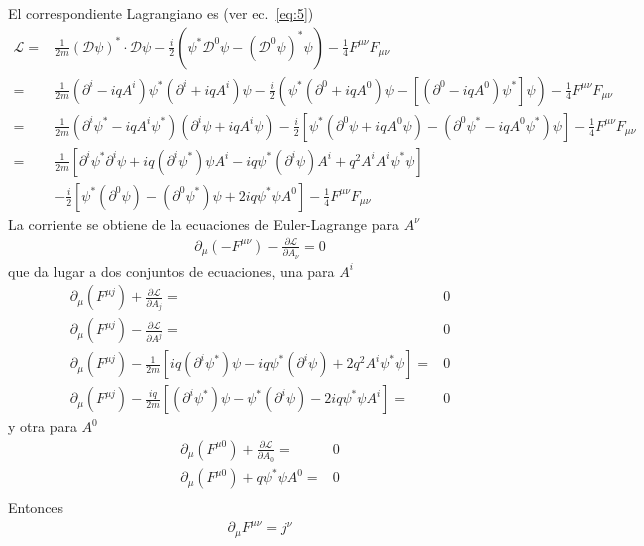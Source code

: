 El correspondiente Lagrangiano es (ver ec.~\eqref{eq:5})
\begin{align*}
    \mathcal{L}=&\frac{1}{2m}(\boldsymbol{\mathcal{D}}\psi)^*\cdot\boldsymbol{\mathcal{D}}\psi-\frac{i}{2}
  \left(    \psi^*\mathcal{D}^0\psi-(\mathcal{D}^0\psi)^*\psi  \right)-\frac{1}{4}F^{\mu\nu}F_{\mu\nu}\\
=&\frac{1}{2m}(\partial^i-i q A^i)\psi^*(\partial^i+i q A^i)\psi-\frac{i}{2}
  \left(    \psi^*(\partial^0+i q A^0)\psi-[(\partial^0-i q A^0)\psi^*]\psi  \right)-\frac{1}{4}F^{\mu\nu}F_{\mu\nu}\\
=&\frac{1}{2m}(\partial^i\psi^*-i q A^i\psi^*)(\partial^i\psi+i q A^i\psi)-\frac{i}{2}
  \left[    \psi^*(\partial^0\psi+i q A^0\psi)-(\partial^0\psi^*-i q A^0\psi^*)\psi  \right]-\frac{1}{4}F^{\mu\nu}F_{\mu\nu}\\
 =&\frac{1}{2m}[\partial^i\psi^*\partial^i\psi+i q(\partial^i\psi^*)\psi A^i-i q \psi^*(\partial^i\psi)A^i+q^2 A^iA^i\psi^*\psi]\\
& -\frac{i}{2}
  \left[    \psi^*(\partial^0\psi) -(\partial^0\psi^*)\psi +2i q \psi^*\psi A^0  \right]-\frac{1}{4}F^{\mu\nu}F_{\mu\nu}
\end{align*}
La corriente se obtiene de la ecuaciones de Euler-Lagrange para $A^\nu$
\begin{align}
  \partial_\mu(-F^{\mu\nu})-\frac{\partial\mathcal{L}}{\partial A_\nu}=0\nonumber
\end{align}
que da lugar a dos conjuntos de ecuaciones, una para $A^i$
\begin{align}
  \partial_\mu(F^{\mu j})+\frac{\partial\mathcal{L}}{\partial A_j}=&0\nonumber\\
  \partial_\mu(F^{\mu j})-\frac{\partial\mathcal{L}}{\partial A^j}=&0\nonumber\\
  \partial_\mu(F^{\mu j})-\frac{1}{2m}[i q(\partial^i\psi^*)\psi -i q \psi^*(\partial^i\psi)+2q^2 A^i\psi^*\psi]=&0\nonumber\\
  \partial_\mu(F^{\mu j})-\frac{i q}{2m}[(\partial^i\psi^*)\psi - \psi^*(\partial^i\psi)-2iq \psi^*\psi A^i]=&0
\end{align}
y otra para $A^0$
\begin{align}
    \partial_\mu(F^{\mu0})+\frac{\partial\mathcal{L}}{\partial A_0}=&0\nonumber\\
    \partial_\mu(F^{\mu0})+q \psi^*\psi A^0=&0\nonumber\\
\end{align}
Entonces
\begin{align*}
\partial_\mu F^{\mu\nu}=j^\nu
\end{align*}
